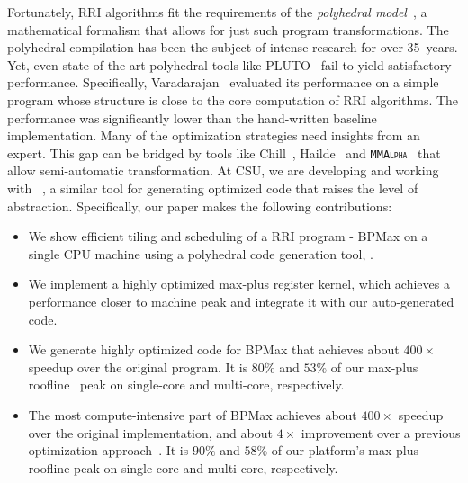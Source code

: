 Fortunately, RRI algorithms fit the requirements of the \emph{polyhedral model}~\cite{sanjay-fst-tcs, sanjay-thesis, sanjay-dc, quinton84c, quinton, quinton-jvsp89, feautrier91, feautrier92a, feautrier92b}, a mathematical formalism that allows for just such program transformations. The polyhedral compilation has been the subject of intense research for over 35~years. Yet, even state-of-the-art polyhedral tools like  PLUTO~\cite{Bondhugula2015PLuToAP, Bondhugula2008} fail to yield satisfactory performance. Specifically, Varadarajan~\cite{Varadarajan2016} evaluated its performance on a simple program whose structure is close to the core computation of RRI algorithms. The performance was significantly lower than the hand-written baseline implementation. Many of the optimization strategies need insights from an expert. This gap can be bridged by tools like Chill~\cite{Chen08chill:a}, Hailde~\cite{RaganKelley2013} and \textsc{\texttt{MMAlpha}}~\cite{guillou-mma} that allow semi-automatic transformation. At CSU, we are developing and working with \textbf{\alphaz}~\cite{sanjay-lcpc2012}, a similar tool for generating optimized code that raises the level of abstraction. Specifically, our paper makes the following contributions:
\begin{itemize}
\item We show efficient tiling and scheduling of a RRI program - BPMax on a single CPU machine using a polyhedral code generation tool, \textbf{\alphaz}.

\item  We implement a highly optimized max-plus register kernel, which achieves a performance closer to machine peak and integrate it with our auto-generated code.

\item We generate highly optimized code for BPMax that achieves about $400\times$ speedup over the original program. It is $80\%$ and $53\%$ of our max-plus roofline~\cite{Williams2008} peak on single-core and multi-core, respectively.

\item The most compute-intensive part of BPMax achieves about $400\times$ speedup over the original implementation, and about $4\times$ improvement over a previous optimization approach~\cite{Mondal2021}. It is $90\%$ and $58\%$ of our platform's max-plus roofline peak on single-core and multi-core, respectively.
\end{itemize}


